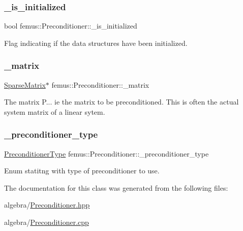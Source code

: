 \subsubsection{\texorpdfstring{\+\_\+is\+\_\+initialized}{\_is\_initialized}}
{\footnotesize\ttfamily bool femus\+::\+Preconditioner\+::\+\_\+is\+\_\+initialized\hspace{0.3cm}{\ttfamily [protected]}}

Flag indicating if the data structures have been initialized. \mbox{\label{classfemus_1_1_preconditioner_a392c385b19a76c936fe03d6e7583f704}} 
\subsubsection{\texorpdfstring{\+\_\+matrix}{\_matrix}}
{\footnotesize\ttfamily \mbox{\hyperlink{classfemus_1_1_sparse_matrix}{Sparse\+Matrix}}$\ast$ femus\+::\+Preconditioner\+::\+\_\+matrix\hspace{0.3cm}{\ttfamily [protected]}}

The matrix P... ie the matrix to be preconditioned. This is often the actual system matrix of a linear sytem. \mbox{\label{classfemus_1_1_preconditioner_afaadf077507ab5f48d186032f8913791}} 
\subsubsection{\texorpdfstring{\+\_\+preconditioner\+\_\+type}{\_preconditioner\_type}}
{\footnotesize\ttfamily \mbox{\hyperlink{_precondtype_enum_8hpp_a8b341faac6531c4543c9dc6e5e4592cf}{Preconditioner\+Type}} femus\+::\+Preconditioner\+::\+\_\+preconditioner\+\_\+type\hspace{0.3cm}{\ttfamily [protected]}}

Enum statitng with type of preconditioner to use. 

The documentation for this class was generated from the following files\+:\begin{DoxyCompactItemize}
\item 
algebra/\mbox{\hyperlink{_preconditioner_8hpp}{Preconditioner.\+hpp}}\item 
algebra/\mbox{\hyperlink{_preconditioner_8cpp}{Preconditioner.\+cpp}}\end{DoxyCompactItemize}
